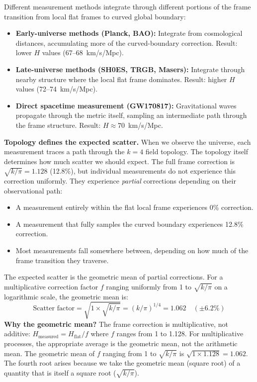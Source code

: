 \documentclass[aps,prd,preprint,superscriptaddress,showpacs,preprintnumbers,amsmath,amssymb,nofootinbib]{revtex4-2}
\begin{document}
Different measurement methods integrate through different portions of the frame transition from local flat frames to curved global boundary:
\begin{itemize}
\item \textbf{Early-universe methods (Planck, BAO):} Integrate from cosmological distances, accumulating more of the curved-boundary correction. Result: lower $H$ values (67--68~km/s/Mpc).
\item \textbf{Late-universe methods (SH0ES, TRGB, Masers):} Integrate through nearby structure where the local flat frame dominates. Result: higher $H$ values (72--74~km/s/Mpc).
\item \textbf{Direct spacetime measurement (GW170817):} Gravitational waves propagate through the metric itself, sampling an intermediate path through the frame structure. Result: $H \approx 70$~km/s/Mpc.
\end{itemize}

\textbf{Topology defines the expected scatter.} When we observe the universe, each measurement traces a path through the $k=4$ field topology. The topology itself determines how much scatter we should expect. The full frame correction is $\sqrt{k/\pi} = 1.128$ (12.8\%), but individual measurements do not experience this correction uniformly. They experience \emph{partial} corrections depending on their observational path:
\begin{itemize}
\item A measurement entirely within the flat local frame experiences 0\% correction.
\item A measurement that fully samples the curved boundary experiences 12.8\% correction.
\item Most measurements fall somewhere between, depending on how much of the frame transition they traverse.
\end{itemize}
The expected scatter is the geometric mean of partial corrections. For a multiplicative correction factor $f$ ranging uniformly from 1 to $\sqrt{k/\pi}$ on a logarithmic scale, the geometric mean is:
\begin{equation}
\text{Scatter factor} = \sqrt{1 \times \sqrt{k/\pi}} = (k/\pi)^{1/4} = 1.062 \quad (\pm 6.2\%)
\label{eq:scatter}
\end{equation}
\textbf{Why the geometric mean?} The frame correction is multiplicative, not additive: $H_{\text{measured}} = H_{\text{flat}}/f$ where $f$ ranges from 1 to 1.128. For multiplicative processes, the appropriate average is the geometric mean, not the arithmetic mean. The geometric mean of $f$ ranging from 1 to $\sqrt{k/\pi}$ is $\sqrt{1 \times 1.128} = 1.062$. The fourth root arises because we take the geometric mean (square root) of a quantity that is itself a square root ($\sqrt{k/\pi}$).
\end{document}
